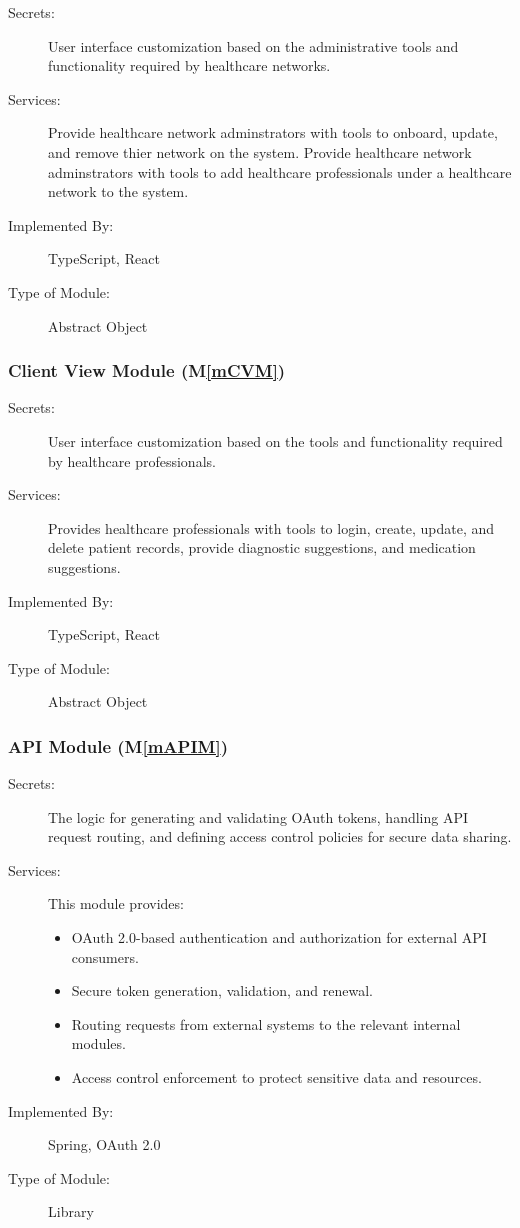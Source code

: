 \documentclass[12pt, titlepage]{article}
\newcommand{\mref}[1]{M\ref{#1}}
\begin{document}
\begin{description}
\item[Secrets:]User interface customization based on the administrative tools and functionality required by healthcare networks.
\item[Services:]Provide healthcare network adminstrators with tools to onboard, update, and remove thier network on the system. Provide healthcare network adminstrators with tools to add healthcare professionals under a healthcare network to the system.
\item[Implemented By:]TypeScript, React
\item[Type of Module:]Abstract Object
\end{description}

\subsubsection{Client View Module (\mref{mCVM})}

\begin{description}
\item[Secrets:]User interface customization based on the tools and functionality required by healthcare professionals.
\item[Services:]Provides healthcare professionals with tools to login, create, update, and delete patient records, provide diagnostic suggestions, and medication suggestions.
\item[Implemented By:]TypeScript, React
\item[Type of Module:]Abstract Object
\end{description}

\subsubsection{API Module (\mref{mAPIM})}

\begin{description}
\item[Secrets:] The logic for generating and validating OAuth tokens, handling API request routing, and defining access control policies for secure data sharing.
\item[Services:] This module provides:
\begin{itemize}
    \item OAuth 2.0-based authentication and authorization for external API consumers.
    \item Secure token generation, validation, and renewal.
    \item Routing requests from external systems to the relevant internal modules.
    \item Access control enforcement to protect sensitive data and resources.
\end{itemize}
\item[Implemented By:] Spring, OAuth 2.0
\item[Type of Module:] Library
\end{description}
\end{document}
